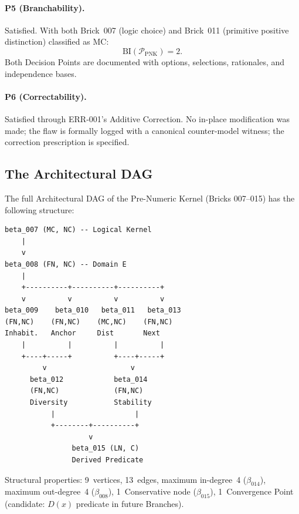 \documentclass[12pt, a4paper]{article}
\theoremstyle{plain}
\theoremstyle{definition}
\theoremstyle{remark}
\newcommand{\BI}[1]{\mathrm{BI}(#1)}
\newcommand{\MC}{\mathrm{MC}}
\begin{document}
\paragraph{P5 (Branchability).}
Satisfied. With both Brick~007 (logic choice) and Brick~011
(primitive positive distinction) classified as $\MC$:
\[
  \BI{\mathcal{P}_{\mathrm{PNK}}} = 2.
\]
Both Decision Points are documented with options, selections,
rationales, and independence bases.

\paragraph{P6 (Correctability).}
Satisfied through ERR-001's Additive Correction. No in-place
modification was made; the flaw is formally logged with a canonical
counter-model witness; the correction prescription is specified.

\subsection{The Architectural DAG}
\label{subsec:ex-dag}

The full Architectural DAG of the Pre-Numeric Kernel (Bricks 007--015)
has the following structure:

\begin{center}
\begin{small}
\begin{verbatim}
beta_007 (MC, NC) -- Logical Kernel
    |
    v
beta_008 (FN, NC) -- Domain E
    |
    +----------+----------+----------+
    v          v          v          v
beta_009    beta_010   beta_011   beta_013
(FN,NC)    (FN,NC)    (MC,NC)    (FN,NC)
Inhabit.   Anchor     Dist       Next
    |          |          |          |
    +----+-----+          +----+-----+
         v                    v
      beta_012            beta_014
      (FN,NC)             (FN,NC)
      Diversity           Stability
           |                   |
           +--------+----------+
                    v
                beta_015 (LN, C)
                Derived Predicate
\end{verbatim}
\end{small}
\end{center}

\noindent
Structural properties: 9~vertices, 13~edges, maximum in-degree~4
($\beta_{014}$), maximum out-degree~4 ($\beta_{008}$), 1~Conservative
node ($\beta_{015}$), 1~Convergence Point (candidate: $D(x)$
predicate in future Branches).
\end{document}

